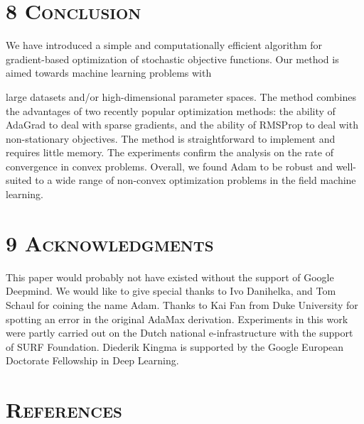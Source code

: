 \documentclass[11pt]{article}
\begin{document}
\vspace{0.5em}

\section*{8 \textsc{Conclusion}}

We have introduced a simple and computationally efficient
algorithm for gradient-based optimization of stochastic objective
functions. Our method is aimed towards machine learning problems
with


\newpage

\setcounter{equation}{12}

\noindent
large datasets and/or high-dimensional parameter spaces. The
method combines the advantages of two recently popular
optimization methods: the ability of AdaGrad to deal with sparse
gradients, and the ability of RMSProp to deal with non-stationary
objectives. The method is straightforward to implement and
requires little memory. The experiments confirm the analysis on
the rate of convergence in convex problems. Overall, we found
Adam to be robust and well-suited to a wide range of non-convex
optimization problems in the field machine learning.

\vspace{0.5em}

\section*{9 \textsc{Acknowledgments}}

This paper would probably not have existed without the support
of Google Deepmind. We would like to give special thanks to Ivo
Danihelka, and Tom Schaul for coining the name Adam. Thanks to
Kai Fan from Duke University for spotting an error in the
original AdaMax derivation. Experiments in this work were partly
carried out on the Dutch national e-infrastructure with the
support of SURF Foundation. Diederik Kingma is supported by the
Google European Doctorate Fellowship in Deep Learning.

\vspace{0.5em}

\section*{\textsc{References}}
\end{document}

